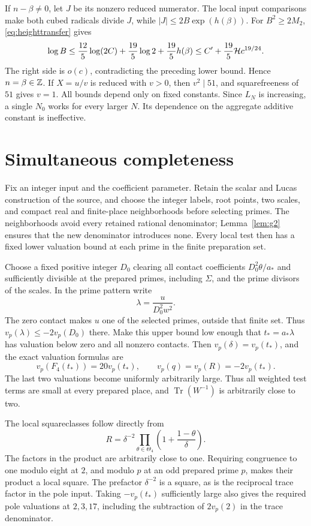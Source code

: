 \documentclass[11pt,a4paper]{article}
\DeclareMathOperator{\Tr}{Tr}\DeclareMathOperator{\Nm}{Nm}
\begin{document}
If $n-\beta\ne0$, let $J$ be its nonzero reduced numerator.
The local input comparisons make both cubed radicals divide $J$,
while $|J|\le2B\exp(h(\beta))$. For $B^2\ge2M_2$,
\eqref{eq:heighttransfer} gives
\[
 \log B\le\frac{12}{5}\log(2C)+\frac{19}{5}\log2
                +\frac{19}{5}h(\beta)
 \le C'+\frac{19}{5}\mathcal H c^{19/24}.
\]
The right side is $o(c)$, contradicting the preceding lower bound.
Hence $n=\beta\in\mathbb Z$. If $X=u/v$ is reduced with $v>0$, then
$v^2\mid51$, and squarefreeness of $51$ gives $v=1$.
All bounds depend only on fixed constants. Since $L_N$ is increasing,
a single $N_0$ works for every larger $N$. Its dependence on the
aggregate additive constant is ineffective.

\section{Simultaneous completeness}
Fix an integer input and the coefficient parameter. Retain the scalar
and Lucas construction of the source, and choose the integer labels,
root points, two scales, and compact real and finite-place neighborhoods
before selecting primes. The neighborhoods avoid every retained
rational denominator; Lemma~\ref{lem:g2} ensures that the new
denominator introduces none. Every local test then has a fixed lower
valuation bound at each prime in the finite preparation set.

Choose a fixed positive integer $D_0$ clearing all contact coefficients
$D_0^2\theta/a_*$ and sufficiently divisible at the prepared primes,
including $\Sigma$, and the prime divisors of the scales. In the prime
pattern write
\[
                         \lambda=\frac{u}{D_0^2w^2}.
\]
The zero contact makes $u$ one of the selected primes, outside that
finite set. Thus $v_p(\lambda)\le-2v_p(D_0)$ there. Make this upper
bound low enough that $t_*=a_*\lambda$ has valuation below zero and
all nonzero contacts. Then $v_p(\delta)=v_p(t_*)$, and the exact
valuation formulas are
\[
 v_p(F_4(t_*))=20v_p(t_*),\qquad
 v_p(q)=v_p(R)=-2v_p(t_*).
\]
The last two valuations become uniformly arbitrarily large. Thus
all weighted test terms are small at every prepared place, and
$\Tr(W^{-1})$ is arbitrarily close to two.

The local squareclasses follow directly from
\begin{equation}\label{eq:preparedsquare}
 R=\delta^{-2}\prod_{\theta\in\Theta_4}
                 \left(1+\frac{1-\theta}{\delta}\right).
\end{equation}
The factors in the product are arbitrarily close to one. Requiring
congruence to one modulo eight at $2$, and modulo $p$ at an odd
prepared prime $p$, makes their product a local square. The prefactor
$\delta^{-2}$ is a square, as is the reciprocal trace factor in the
pole input. Taking $-v_p(t_*)$ sufficiently large also gives the
required pole valuations at $2,3,17$, including the subtraction
of $2v_p(2)$ in the trace denominator.
\end{document}

